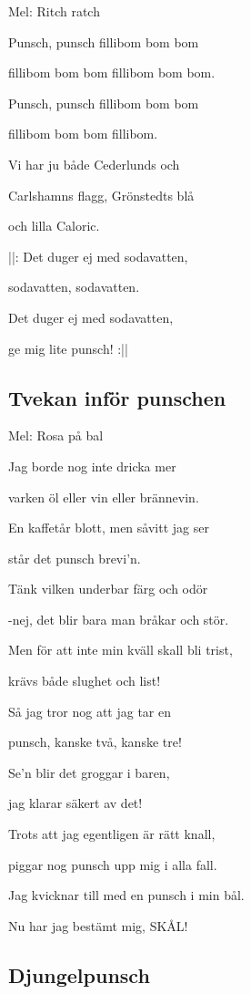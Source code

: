 Mel: Ritch ratch\bigskip

Punsch, punsch fillibom bom bom

fillibom bom bom fillibom bom bom.

Punsch, punsch fillibom bom bom

fillibom bom bom fillibom.

Vi har ju både Cederlunds och

Carlshamns flagg, Grönstedts blå

och lilla Caloric.

||: Det duger ej med sodavatten,

sodavatten, sodavatten.

Det duger ej med sodavatten,

ge mig lite punsch! :||

\subsection{\textbf{Tvekan inför punschen}}

Mel: Rosa på bal\bigskip

Jag borde nog inte dricka mer

varken öl eller vin eller brännevin.

En kaffetår blott, men såvitt jag ser

står det punsch brevi’n.\bigskip

Tänk vilken underbar färg och odör

-nej, det blir bara man bråkar och stör.

Men för att inte min kväll skall bli trist,

krävs både slughet och list!\bigskip

Så jag tror nog att jag tar en

punsch, kanske två, kanske tre!

Se’n blir det groggar i baren,

jag klarar säkert av det!\bigskip

Trots att jag egentligen är rätt knall,

piggar nog punsch upp mig i alla fall.

Jag kvicknar till med en punsch i min bål.

Nu har jag bestämt mig, SKÅL!\bigskip

\subsection{\textbf{Djungelpunsch}}

